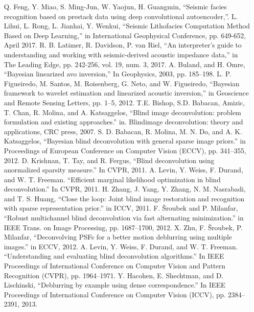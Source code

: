 \documentclass[conference]{IEEEtran}
\begin{document}
\begin{thebibliography}{00}
			Q. Feng, Y. Miao, S. Ming-Jun, W. Yaojun, H. Guangmin, ``Seismic facies recognition based on prestack data using deep convolutional autoencoder,''.
 			L. Lihui, L. Rong, L. Jianhai, Y. Wenkui, ``Seismic Lithofacies Computation Method Based on Deep Learning,'' in International Geophysical Conference, pp. 649-652, April 2017.
 		R. B. Latimer, R. Davidson, P. van Riel, ``An interpreter's guide to understanding and working with seismic-derived acoustic impedance data,'' in The Leading Edge, pp. 242-256, vol. 19, num. 3, 2017.
		A. Buland,  and H. Omre, ``Bayesian linearized avo inversion,'' In Geophysics, 2003, pp. 185–198.
	L. P. Figueiredo, M. Santos, M. Roisenberg, G. Neto, and W. Figueiredo, ``Bayesian framework to wavelet estimation and linearized acoustic inversion,'' in Geoscience and Remote Sensing Letters, pp. 1–5, 2012.
		T.E. Bishop, S.D. Babacan, Amizic, T. Chan, R. Molina, and A. Katsaggelos, ``Blind image deconvolution: problem formulation and existing approaches.'' in. Blindimage deconvolution: theory and applications,  CRC press, 2007.
		S. D. Babacan, R. Molina, M. N. Do, and A. K. Katsaggelos, ``Bayesian blind deconvolution with general sparse image priors.'' in Proceedings of European Conference on Computer Vision (ECCV), pp. 341–355, 2012.
		D. Krishnan, T. Tay, and R. Fergus, ``Blind deconvolution using anormalized sparsity measure.'' In CVPR, 2011.
		A. Levin, Y. Weiss, F. Durand, and W. T. Freeman. ``Efficient marginal likelihood optimization in blind deconvolution.'' In CVPR, 2011.
		H. Zhang, J. Yang, Y. Zhang, N. M. Nasrabadi, and T. S. Huang, ``Close the loop: Joint blind image restoration and recognition with sparse representation prior.'' in ICCV, 2011. 
		F. Šroubek and P. Milanfar, ``Robust multichannel blind deconvolution via fast alternating minimization.'' in IEEE Trans. on Image Processing, pp. 1687–1700, 2012.
		X. Zhu, F. Šroubek, P. Milanfar, ``Deconvolving PSFs for a better motion deblurring using multiple images.'' in ECCV, 2012.
			A. Levin, Y. Weiss, F. Durand, and W. T. Freeman. ``Understanding and evaluating blind deconvolution algorithms.'' In IEEE Proceedings of International Conference on Computer Vision and Pattern Recognition (CVPR), pp. 1964–1971.
		Y. Hacohen, E. Shechtman, and D. Lischinski, ``Deblurring by example using dense correspondence.'' In IEEE Proceedings of International Conference on Computer Vision (ICCV), pp. 2384–2391, 2013.

\end{thebibliography}
\end{document}

